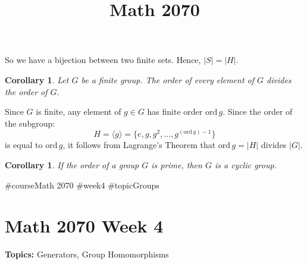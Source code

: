 \documentclass[a4paper,12pt]{report}
\newcommand{\abs}[1]{\left|#1\right|}
\newcommand{\ord}{\mathrm{ord}\,}
\renewcommand{\ord}{\mathrm{ord}\,}
\newcounter{statement}
\numberwithin{statement}{chapter}
\newtheorem{cor}[statement]{Corollary}
\numberwithin{equation}{chapter}
\numberwithin{section}{chapter}
\numberwithin{subsection}{section}
\begin{document}
So we have a bijection between two finite sets.  Hence, $\abs{S} = \abs{H}$.




\begin{cor}
Let $G$ be a finite group.
The order of every element of $G$  divides the order of $G$.
\end{cor}



Since $G$ is finite, any element of $g \in G$ has finite order $\ord g$.
Since the order of the subgroup:
\[
H = \langle g \rangle
= \{e, g, g^2, \ldots, g^{(\ord g) - 1}\}
\]
is equal to $\ord g$,
it follows from Lagrange's Theorem that $\ord g = \abs{H}$ divides $\abs{G}$.



\begin{cor}
If the order of a group $G$ is prime, then $G$ is a cyclic group.
\end{cor}



#course{Math 2070}
#week{4}
#topic{Groups}
\title{Math 2070}
\setcounter{chapter}{4}\setcounter{section}{0}
\setcounter{subsection}{0}


\chapter*{Math 2070 Week 4}
{\bf Topics: }Generators, Group Homomorphisms
\end{document}
